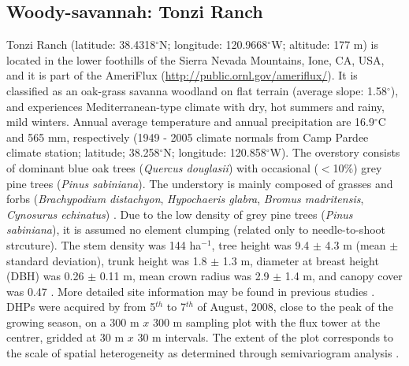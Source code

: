 \subsection{Woody-savannah: Tonzi Ranch}

Tonzi Ranch (latitude: 38.4318$^{\circ}$N; longitude: 120.9668$^{\circ}$W; altitude: 177 m) is located in the lower foothills of the Sierra Nevada Mountains, Ione, CA, USA, and it is part of the AmeriFlux (\url{http://public.ornl.gov/ameriflux/}). It is classified as an oak-grass savanna woodland on flat terrain (average slope: 1.58$^{\circ}$), and experiences Mediterranean-type climate with dry, hot summers and rainy, mild winters. Annual average temperature and annual precipitation are 16.9$^{\circ}$C and 565 mm, respectively (1949 - 2005 climate normals from Camp Pardee climate station; latitude; 38.258$^{\circ}$N; longitude: 120.858$^{\circ}$W). The overstory consists of dominant blue oak trees (\textit{Quercus douglasii}) with occasional ($<$10\%) grey pine trees (\textit{Pinus sabiniana}). The understory is mainly composed of grasses and forbs (\textit{Brachypodium distachyon}, \textit{Hypochaeris glabra}, \textit{Bromus madritensis}, \textit{Cynosurus echinatus}) \citep{Baldocchi2004}. Due to the low density of grey pine trees (\textit{Pinus sabiniana}), it is assumed no element clumping (related only to needle-to-shoot strcuture). The stem density was 144 ha$^{-1}$, tree height was 9.4 $\pm$ 4.3 m (mean $\pm$ standard deviation), trunk height was 1.8 $\pm$ 1.3 m, diameter at breast height (DBH) was 0.26 $\pm$ 0.11 m, mean crown radius was 2.9 $\pm$ 1.4 m, and canopy cover was 0.47 \citep{Chen2008}. More detailed site information may be found in previous studies \citep{Baldocchi2004,Ma2007,Chen2008}. DHPs were acquired by \citet{Ryu2010} from 5$^{th}$ to 7$^{th}$ of August, 2008, close to the peak of the growing season, on a 300 m $x$ 300 m sampling plot with the flux tower at the centrer, gridded at 30 m $x$ 30 m intervals. The extent of the plot corresponds to the scale of spatial heterogeneity as determined through semivariogram analysis \citep{Kim2006}.

